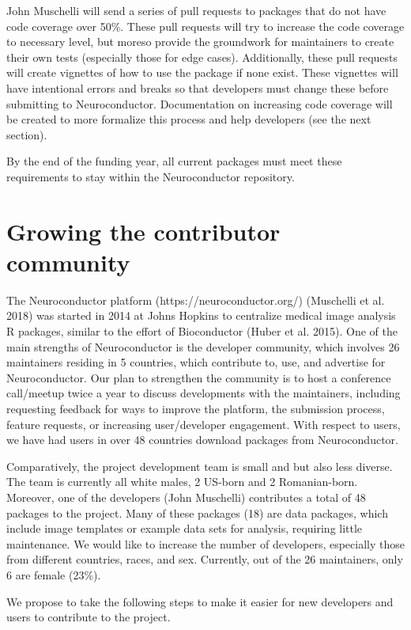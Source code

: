\documentclass[]{elsarticle} %
\begin{document}
John Muschelli will send a series of pull requests to packages that do
not have code coverage over 50\%. These pull requests will try to
increase the code coverage to necessary level, but moreso provide the
groundwork for maintainers to create their own tests (especially those
for edge cases). Additionally, these pull requests will create vignettes
of how to use the package if none exist. These vignettes will have
intentional errors and breaks so that developers must change these
before submitting to Neuroconductor. Documentation on increasing code
coverage will be created to more formalize this process and help
developers (see the next section).

By the end of the funding year, all current packages must meet these
requirements to stay within the Neuroconductor repository.

\section{Growing the contributor
community}\label{growing-the-contributor-community}

The Neuroconductor platform (https://neuroconductor.org/) (Muschelli et
al. 2018) was started in 2014 at Johns Hopkins to centralize medical
image analysis R packages, similar to the effort of Bioconductor (Huber
et al. 2015). One of the main strengths of Neuroconductor is the
developer community, which involves 26 maintainers residing in 5
countries, which contribute to, use, and advertise for Neuroconductor.
Our plan to strengthen the community is to host a conference call/meetup
twice a year to discuss developments with the maintainers, including
requesting feedback for ways to improve the platform, the submission
process, feature requests, or increasing user/developer engagement. With
respect to users, we have had users in over 48 countries download
packages from Neuroconductor.

Comparatively, the project development team is small and but also less
diverse. The team is currently all white males, 2 US-born and 2
Romanian-born. Moreover, one of the developers (John Muschelli)
contributes a total of 48 packages to the project. Many of these
packages (18) are data packages, which include image templates or
example data sets for analysis, requiring little maintenance. We would
like to increase the number of developers, especially those from
different countries, races, and sex. Currently, out of the 26
maintainers, only 6 are female (23\%).

We propose to take the following steps to make it easier for new
developers and users to contribute to the project.
\end{document}

